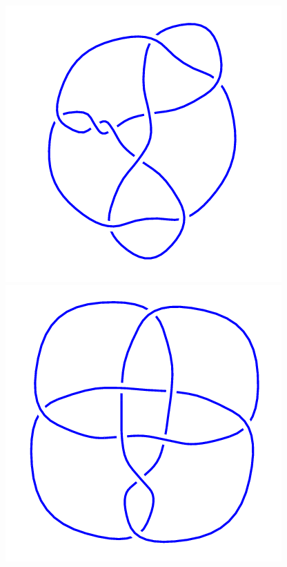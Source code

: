 \begin{figure}[H]
	\begin{minipage}[b]{.18\linewidth}
		\centering
		\includegraphics[width=\linewidth]{../data/9_46.png}
	\end{minipage}
	\begin{minipage}[b]{.18\linewidth}
		\centering
		\includegraphics[width=\linewidth]{../data/9_47.png}

\end{minipage}
\end{figure}
